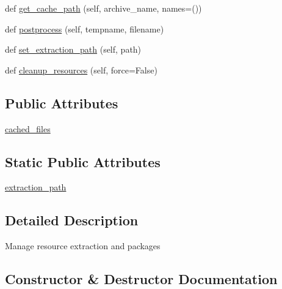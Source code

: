 \begin{DoxyCompactItemize}
def \hyperlink{classpip_1_1__vendor_1_1pkg__resources_1_1ResourceManager_abb9704b64700741ee3a3ad67f7cad5bd}{get\+\_\+cache\+\_\+path} (self, archive\+\_\+name, names=())
\item 
def \hyperlink{classpip_1_1__vendor_1_1pkg__resources_1_1ResourceManager_a9e78cfa1ec4394b29ddd61e2e02fffb8}{postprocess} (self, tempname, filename)
\item 
def \hyperlink{classpip_1_1__vendor_1_1pkg__resources_1_1ResourceManager_aafe1d1584c810870b13a0ec7409c87d0}{set\+\_\+extraction\+\_\+path} (self, path)
\item 
def \hyperlink{classpip_1_1__vendor_1_1pkg__resources_1_1ResourceManager_aa33a85f98817f7e76b8f3f4cfed9a8e1}{cleanup\+\_\+resources} (self, force=False)
\end{DoxyCompactItemize}
\subsection*{Public Attributes}
\begin{DoxyCompactItemize}
\item 
\hyperlink{classpip_1_1__vendor_1_1pkg__resources_1_1ResourceManager_aea575c7d408f076473dceda4dfd972be}{cached\+\_\+files}
\end{DoxyCompactItemize}
\subsection*{Static Public Attributes}
\begin{DoxyCompactItemize}
\item 
\hyperlink{classpip_1_1__vendor_1_1pkg__resources_1_1ResourceManager_aa2b57b775489db4ed4491cfdfc8534cf}{extraction\+\_\+path}
\end{DoxyCompactItemize}


\subsection{Detailed Description}
\begin{DoxyVerb}Manage resource extraction and packages\end{DoxyVerb}
 

\subsection{Constructor \& Destructor Documentation}
\mbox{\label{classpip_1_1__vendor_1_1pkg__resources_1_1ResourceManager_acf384dd97633547241555a3e98bf311c}} 
